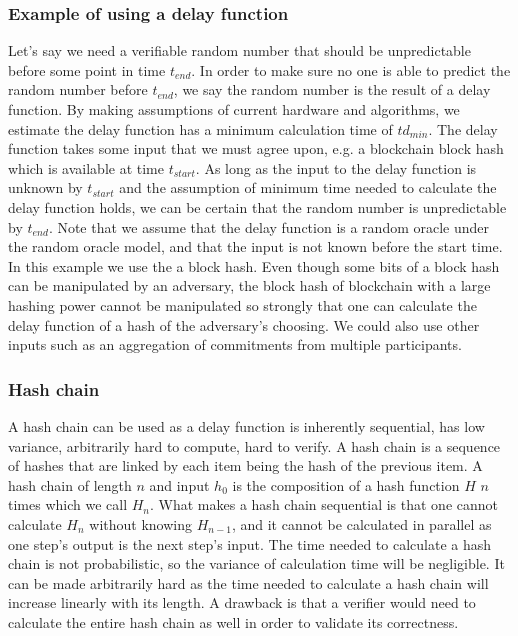 \subsubsection{Example of using a delay function}
Let's say we need a verifiable random number that should be unpredictable before some point in time $t_{end}$. In order to make sure no one is able to predict the random number before $t_{end}$, we say the random number is the result of a delay function. By making assumptions of current hardware and algorithms, we estimate the delay function has a minimum calculation time of $td_{min}$. The delay function takes some input that we must agree upon, e.g. a blockchain block hash which is available at time $t_{start}$. As long as the input to the delay function is unknown by $t_{start}$ and the assumption of minimum time needed to calculate the delay function holds, we can be certain that the random number is unpredictable by $t_{end}$. Note that we assume that the delay function is a random oracle under the random oracle model, and that the input is not known before the start time. In this example we use the a block hash. Even though some bits of a block hash can be manipulated by an adversary, the block hash of blockchain with a large hashing power cannot be manipulated so strongly that one can calculate the delay function of a hash of the adversary's choosing. We could also use other inputs such as an aggregation of commitments from multiple participants.

\subsubsection{Hash chain}
A hash chain can be used as a delay function is inherently sequential, has low variance, arbitrarily hard to compute, hard to verify. A hash chain is a sequence of hashes that are linked by each item being the hash of the previous item. A hash chain of length $n$ and input $h_0$ is the composition of a hash function $H$ $n$ times which we call $H_n$. What makes a hash chain sequential is that one cannot calculate $H_n$ without knowing $H_{n-1}$, and it cannot be calculated in parallel as one step's output is the next step's input. The time needed to calculate a hash chain is not probabilistic, so the variance of calculation time will be negligible. It can be made arbitrarily hard as the time needed to calculate a hash chain will increase linearly with its length. A drawback is that a verifier would need to calculate the entire hash chain as well in order to validate its correctness. 

